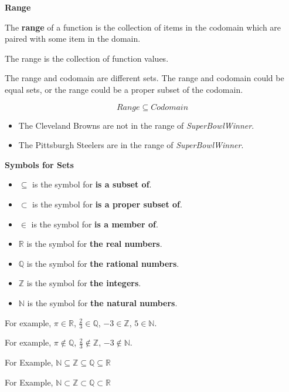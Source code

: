 \documentclass{ximera}
\begin{document}
\begin{definition} \textbf{\textcolor{green!50!black}{Range}} 

The \textbf{range} of a function is the collection of items in the codomain which are paired with some item in the domain.  

The range is the collection of function values.

\end{definition}

The range and codomain are different sets.  The range and codomain could be equal sets, or the range could be a proper subset of the codomain. 

\[  Range \subseteq Codomain\]

\begin{itemize}
\item The Cleveland Browns are not in the range of \textit{SuperBowlWinner}.  
\item The Pittsburgh Steelers are in the range of \textit{SuperBowlWinner}.
\end{itemize}











\begin{notation}  \textbf{\textcolor{red!50!green}{Symbols for Sets}}  

\begin{itemize}
\item $\subseteq$ is the symbol for \textbf{is a subset of}.
\item $\subset$ is the symbol for \textbf{is a proper subset of}.
\item $\in$ is the symbol for \textbf{is a member of}.
\item $\mathbb{R}$ is the symbol for \textbf{the real numbers}.
\item $\mathbb{Q}$ is the symbol for \textbf{the rational numbers}.
\item $\mathbb{Z}$ is the symbol for \textbf{the integers}.
\item $\mathbb{N}$ is the symbol for \textbf{the natural numbers}.
\end{itemize}


For example, $\pi \in \mathbb{R}$, $\tfrac{2}{3} \in \mathbb{Q}$, $-3 \in \mathbb{Z}$, $5 \in \mathbb{N}$. 

For example, $\pi \notin \mathbb{Q}$, $\tfrac{2}{3} \notin \mathbb{Z}$, $-3 \notin \mathbb{N}$. 

For Example,  $\mathbb{N} \subseteq \mathbb{Z} \subseteq \mathbb{Q} \subseteq \mathbb{R}$ 

For Example,  $\mathbb{N} \subset \mathbb{Z} \subset \mathbb{Q} \subset \mathbb{R}$


\end{notation}
\end{document}
